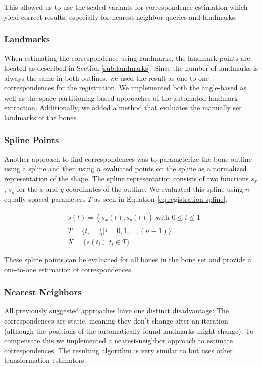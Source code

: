 \documentclass[pdftex,12pt,a4paper]{report}
\begin{document}
This allowed us to use the scaled variants for correspondence estimation which yield correct results, especially
for nearest neighbor queries and landmarks.

\subsubsection{Landmarks}

When estimating the correspondence using landmarks, the landmark points are located as described in Section
\ref{sub:landmarks}. Since the number of landmarks is always the same in both outlines, we used the result
as one-to-one correspondences for the registration. We implemented both the angle-based as well as the
space-partitioning-based approaches of the automated landmark extraction. Additionally, we added a method
that evaluates the manually set landmarks of the bones.

\subsubsection{Spline Points}

Another approach to find correspondences was to parameterize the bone outline using a spline and then using $n$
evaluated points on the spline as a normalized representation of the shape. The spline representation consists
of two functions $s_x$, $s_y$ for the $x$ and $y$ coordinates of the outline. We evaluated this spline using $n$
equally spaced parameters $T$ as seen in Equation \ref{eq:registration-spline}.

\begin{equation}
\label{eq:registration-spline}
\begin{split}
& s(t) = ( s_x(t), s_y(t) ) \text{ with } 0 \leq t \leq 1 \\
& T = \{ t_i=\frac{i}{n} | i=0, 1, \dots, (n-1) \} \\
& X = \{ s(t_i) | t_i \in T \}
\end{split}
\end{equation}

These spline points can be evaluated for all bones in the bone set and provide a one-to-one estimation of correspondences.

\subsubsection{Nearest Neighbors}

All previously suggested approaches have one distinct disadvantage: The correspondences are static, meaning they don't
change after an iteration (although the positions of the automatically found landmarks might change). To compensate this
we implemented a nearest-neighbor approach to estimate correspondences. The resulting algorithm is very similar to
\cite{besl1992method} but uses other transformation estimators.
\end{document}
